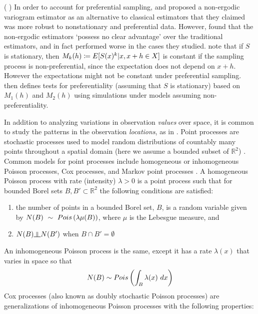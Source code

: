 \documentclass{uwstat572}
\newcommand{\vmcomment}[1]{({\color{blue}{VM's comment:}} \textbf{\color{blue}{#1}})}
\begin{document}
\par
\vmcomment{I would beef up literature review with connections to other fields, where something like preferential sampling comes up. For example, informative doctor visit times in medical statistics. The discussion of the paper may provide more connections.}
In order to account for preferential sampling, \citet{isaaks1988} and \citet{srivastava1989} proposed a non-ergodic variogram estimator as an alternative to classical estimators that they claimed was more robust to nonstationary and preferential data.  However, \citet{curriero2002} found that the non-ergodic estimators `possess no clear advantage' over the traditional estimators, and in fact performed worse in the cases they studied.  \citet{schlather2004} note that if $S$ is stationary, then $M_k(h) \coloneqq E[S(x)^k \vert x, x+h \in X]$ is constant if the sampling process is non-preferential, since the expectation does not depend on $x+h$.  However the expectations might not be constant under preferential sampling.  \citet{schlather2004} then defines tests for preferentiality (assuming that $S$ is stationary) based on $M_1(h)$ and $M_2(h)$ using simulations under models assuming non-preferentiality.
\par
In addition to analyzing variations in observation \emph{values} over space, it is common to study the patterns in the observation \emph{locations}, as in \citet{diggle2010}.  Point processes are stochastic processes used to model random distributions of countably many points throughout a spatial domain (here we assume a bounded subset of $\mathbb{R}^2$) \citep{handbook}.  Common models for point processes include homogeneous or inhomogeneous Poisson processes, Cox processes, and Markov point processes \citep{handbook}.  A homogeneous Poisson process with rate (intensity) $\lambda > 0$ is a point process such that for bounded Borel sets $B, B' \subset \mathbb{R}^2$ the following conditions are satisfied:
\begin{enumerate}
\item the number of points in a bounded Borel set, $B$, is a random variable given by $N(B)~\sim~Pois \left( \lambda \mu(B) \right) $, where $\mu$ is the Lebesgue measure, and
\item $N(B) \indep N(B')$ when $B \cap B' = \emptyset$
\end{enumerate}
An inhomogeneous Poisson process is the same, except it has a rate $\lambda(x)$ that varies in space so that 
$$ N(B) \sim Pois \left( \int_B \lambda(x) \ dx \right) $$
Cox processes \citep{cox1955} (also known as doubly stochastic Poisson processes) are generalizations of inhomogeneous Poisson processes with the following properties:
\end{document}
